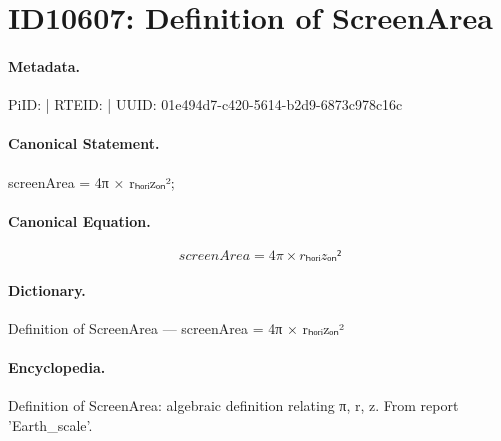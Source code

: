 \section*{ID10607: Definition of ScreenArea}
\paragraph{Metadata.}
PiID:  | RTEID:  | UUID: 01e494d7-c420-5614-b2d9-6873c978c16c

\paragraph{Canonical Statement.}
screenArea = 4π × rₕₒᵣᵢzₒₙ²;

\paragraph{Canonical Equation.}
\[
screenArea = 4π × rₕₒᵣᵢzₒₙ²
\]

\paragraph{Dictionary.}
Definition of ScreenArea — screenArea = 4π × rₕₒᵣᵢzₒₙ²

\paragraph{Encyclopedia.}
Definition of ScreenArea: algebraic definition relating π, r, z. From report 'Earth\_scale'.
